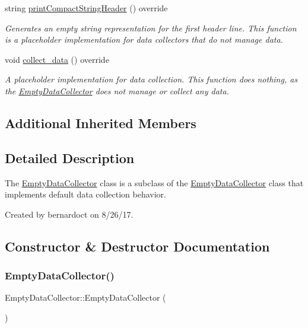 \begin{DoxyCompactItemize}
string \mbox{\hyperlink{classEmptyDataCollector_a345d478e92af2ab4bcbaeeae3c7a3faa}{print\+Compact\+String\+Header}} () override
\begin{DoxyCompactList}\small\item\em Generates an empty string representation for the first header line. This function is a placeholder implementation for data collectors that do not manage data. \end{DoxyCompactList}\item 
void \mbox{\hyperlink{classEmptyDataCollector_a2993f4e00acd2eff18bed2e39108e89f}{collect\+\_\+data}} () override
\begin{DoxyCompactList}\small\item\em A placeholder implementation for data collection. This function does nothing, as the \mbox{\hyperlink{classEmptyDataCollector}{Empty\+Data\+Collector}} does not manage or collect any data. \end{DoxyCompactList}\end{DoxyCompactItemize}
\subsection*{Additional Inherited Members}


\subsection{Detailed Description}
The {\ttfamily \mbox{\hyperlink{classEmptyDataCollector}{Empty\+Data\+Collector}}} class is a subclass of the {\ttfamily \mbox{\hyperlink{classEmptyDataCollector}{Empty\+Data\+Collector}}} class that implements default data collection behavior. 

Created by bernardoct on 8/26/17. 

\subsection{Constructor \& Destructor Documentation}
\mbox{\label{classEmptyDataCollector_ae6ec59ac659f009c76525f00c5319524}} 
\subsubsection{\texorpdfstring{Empty\+Data\+Collector()}{EmptyDataCollector()}}
{\footnotesize\ttfamily Empty\+Data\+Collector\+::\+Empty\+Data\+Collector (\begin{DoxyParamCaption}{ }\end{DoxyParamCaption})}



